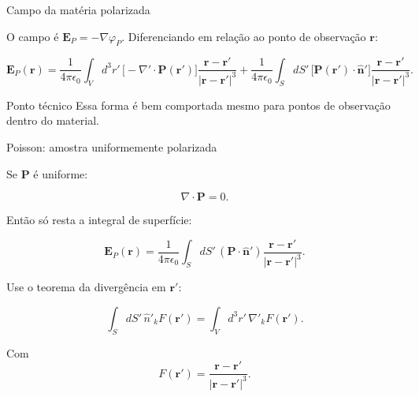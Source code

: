 \documentclass[aspectratio=169]{beamer}
\begin{document}
\begin{frame}{Campo da matéria polarizada}

\small

O campo é \(\mathbf E_P=-\nabla\varphi_P\). Diferenciando em relação ao ponto de
observação \(\mathbf r\):

\begin{eqbox}
\begin{equation}
\mathbf E_P(\mathbf r)
=
\frac{1}{4\pi\epsilon_0}
\int_V d^3r'\,
\big[-\nabla'\cdot\mathbf P(\mathbf r')\big]
\frac{\mathbf r-\mathbf r'}{|\mathbf r-\mathbf r'|^3}
+
\frac{1}{4\pi\epsilon_0}
\int_S dS'\,
\big[\mathbf P(\mathbf r')\cdot\hat{\mathbf n}'\big]
\frac{\mathbf r-\mathbf r'}{|\mathbf r-\mathbf r'|^3}.
\tag{6.13}
\label{eq:campo-polarizacao}
\end{equation}
\end{eqbox}

\begin{alertblock}{Ponto técnico}
Essa forma é bem comportada mesmo para pontos de observação dentro do material.
\end{alertblock}

\end{frame}

\begin{frame}{Poisson: amostra uniformemente polarizada}

\small

Se \(\mathbf P\) é uniforme:

\[
\nabla\cdot\mathbf P=0.
\]

Então só resta a integral de superfície:

\[
\mathbf E_P(\mathbf r)
=
\frac{1}{4\pi\epsilon_0}
\int_S dS'\,
(\mathbf P\cdot\hat{\mathbf n}')
\frac{\mathbf r-\mathbf r'}{|\mathbf r-\mathbf r'|^3}.
\]

Use o teorema da divergência em \(\mathbf r'\):

\[
\int_S dS'\,\hat n'_k F(\mathbf r')
=
\int_V d^3r'\,\nabla'_k F(\mathbf r').
\]

Com
\[
F(\mathbf r')=\frac{\mathbf r-\mathbf r'}{|\mathbf r-\mathbf r'|^3}.
\]

\end{frame}
\end{document}
